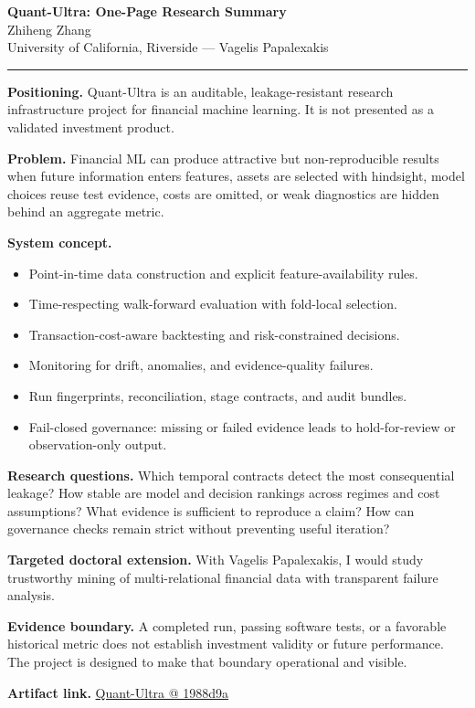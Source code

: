 \documentclass[11pt]{article}
\makeatletter
\newcommand{\ApplicantName}{Zhiheng Zhang}
\newcommand{\ApplicantGitHub}{\href{https://github.com/zhiheng-zhang-Mera/Quant-Ultra/tree/1988d9a8530da91a8158de864d098ea869098923}{Quant-Ultra @ 1988d9a}}
\makeatother
\begin{document}
\begin{center}
{\LARGE\bfseries Quant-Ultra: One-Page Research Summary}\\[0.25em]
{\large \ApplicantName}\\
University of California, Riverside --- Vagelis Papalexakis
\end{center}
\vspace{0.35em}\hrule\vspace{0.65em}

\textbf{Positioning.} Quant-Ultra is an auditable, leakage-resistant research infrastructure project for financial machine learning. It is not presented as a validated investment product.

\textbf{Problem.} Financial ML can produce attractive but non-reproducible results when future information enters features, assets are selected with hindsight, model choices reuse test evidence, costs are omitted, or weak diagnostics are hidden behind an aggregate metric.

\textbf{System concept.}
\begin{itemize}
\item Point-in-time data construction and explicit feature-availability rules.
\item Time-respecting walk-forward evaluation with fold-local selection.
\item Transaction-cost-aware backtesting and risk-constrained decisions.
\item Monitoring for drift, anomalies, and evidence-quality failures.
\item Run fingerprints, reconciliation, stage contracts, and audit bundles.
\item Fail-closed governance: missing or failed evidence leads to hold-for-review or observation-only output.
\end{itemize}

\textbf{Research questions.} Which temporal contracts detect the most consequential leakage? How stable are model and decision rankings across regimes and cost assumptions? What evidence is sufficient to reproduce a claim? How can governance checks remain strict without preventing useful iteration?

\textbf{Targeted doctoral extension.} With Vagelis Papalexakis, I would study trustworthy mining of multi-relational financial data with transparent failure analysis.

\textbf{Evidence boundary.} A completed run, passing software tests, or a favorable historical metric does not establish investment validity or future performance. The project is designed to make that boundary operational and visible.

\textbf{Artifact link.} \ApplicantGitHub
\end{document}

